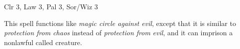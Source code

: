 
\begin{description*}
\item[Level:] Clr 3, Law 3, Pal 3, Sor/Wiz 3
\end{description*}

This spell functions like \textit{magic circle against evil}, except that it is
similar to \textit{protection from chaos} instead of \textit{protection from evil},
and it can imprison a nonlawful called creature.